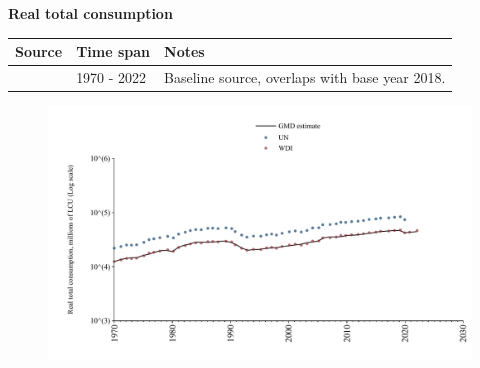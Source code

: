 \documentclass[12pt,a4paper,landscape]{article}
\begin{document}
\begin{adjustbox}{max totalsize={\paperwidth}{\paperheight},center}
\begin{minipage}[t][\textheight][t]{\textwidth}
\vspace*{0.5cm}
{}
\begin{center}
{\Large\bfseries Real total consumption}
\end{center}
\vspace{0.5cm}
\begin{table}[H]
\centering
\small
\begin{tabular}{|l|l|l|}
\hline
\textbf{Source} & \textbf{Time span} & \textbf{Notes} \\
\hline
\rowcolor{white}\cite{WDI}& 1970 - 2022 &Baseline source, overlaps with base year 2018. \\
\hline
\end{tabular}
\end{table}
\begin{figure}[H]
\centering
\includegraphics[width=\textwidth,height=0.6\textheight,keepaspectratio]{graphs/CUB_rcons.pdf}
\end{figure}
\end{minipage}
\end{adjustbox}
\end{document}
